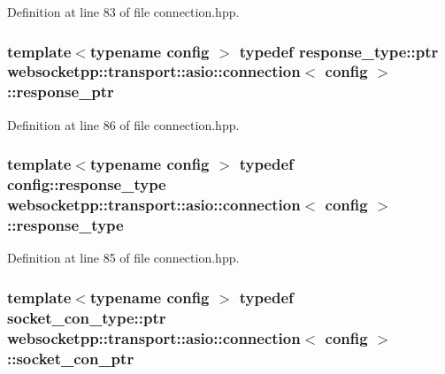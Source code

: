 Definition at line 83 of file connection.\+hpp.

\hypertarget{classwebsocketpp_1_1transport_1_1asio_1_1connection_a2ff953856756493592411577bb4640d2}{}
\subsubsection[{response\+\_\+ptr}]{\setlength{\rightskip}{0pt plus 5cm}template$<$typename config $>$ typedef response\+\_\+type\+::ptr {\bf websocketpp\+::transport\+::asio\+::connection}$<$ config $>$\+::{\bf response\+\_\+ptr}}\label{classwebsocketpp_1_1transport_1_1asio_1_1connection_a2ff953856756493592411577bb4640d2}


Definition at line 86 of file connection.\+hpp.

\hypertarget{classwebsocketpp_1_1transport_1_1asio_1_1connection_a493602c4469c407f3a94edf71ed9705e}{}
\subsubsection[{response\+\_\+type}]{\setlength{\rightskip}{0pt plus 5cm}template$<$typename config $>$ typedef config\+::response\+\_\+type {\bf websocketpp\+::transport\+::asio\+::connection}$<$ config $>$\+::{\bf response\+\_\+type}}\label{classwebsocketpp_1_1transport_1_1asio_1_1connection_a493602c4469c407f3a94edf71ed9705e}


Definition at line 85 of file connection.\+hpp.

\hypertarget{classwebsocketpp_1_1transport_1_1asio_1_1connection_a2a0647a77eebc0e37111a4d39e6dc726}{}
\subsubsection[{socket\+\_\+con\+\_\+ptr}]{\setlength{\rightskip}{0pt plus 5cm}template$<$typename config $>$ typedef socket\+\_\+con\+\_\+type\+::ptr {\bf websocketpp\+::transport\+::asio\+::connection}$<$ config $>$\+::{\bf socket\+\_\+con\+\_\+ptr}}\label{classwebsocketpp_1_1transport_1_1asio_1_1connection_a2a0647a77eebc0e37111a4d39e6dc726}


